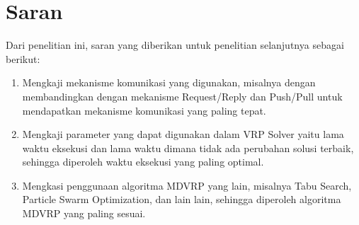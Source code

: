 \section{Saran}
Dari penelitian ini, saran yang diberikan untuk penelitian selanjutnya sebagai berikut:

\begin{enumerate}
	\item Mengkaji mekanisme komunikasi yang digunakan, misalnya dengan membandingkan dengan mekanisme Request/Reply dan Push/Pull untuk mendapatkan mekanisme komunikasi yang paling tepat.
	\item Mengkaji parameter yang dapat digunakan dalam VRP Solver yaitu lama waktu eksekusi dan lama waktu dimana tidak ada perubahan solusi terbaik, sehingga diperoleh waktu eksekusi yang paling optimal.
	\item Mengkasi penggunaan algoritma MDVRP yang lain, misalnya Tabu Search, Particle Swarm Optimization, dan lain lain, sehingga diperoleh algoritma MDVRP yang paling sesuai.
\end{enumerate}
